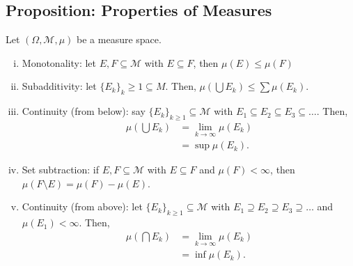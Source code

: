\documentclass[9pt]{extarticle}
\begin{document}
  \subsection{Proposition: Properties of Measures}%
  Let $(\Omega,\mathcal{M},\mu)$ be a measure space.
  \begin{enumerate}[(i)]
    \item Monotonality: let $E,F\subseteq \mathcal{M}$ with $E\subseteq F$, then $\mu(E) \leq \mu(F)$
    \item Subadditivity: let $\{E_k\}_k\geq 1\subseteq M$. Then, $\mu\left(\bigcup E_k\right)\leq \sum \mu(E_k)$.
    \item Continuity (from below): say $\{E_k\}_{k\geq 1}\subseteq \mathcal{M}$ with $E_1\subseteq E_2\subseteq E_3\subseteq \dots$. Then, 
      \begin{align*}
        \mu\left(\bigcup E_k\right) &= \lim_{k\rightarrow\infty}\mu(E_k)\\
        &= \sup \mu(E_k).
      \end{align*}
    \item Set subtraction: if $E,F\subseteq \mathcal{M}$ with $E \subseteq F$ and $\mu(F) < \infty$, then $\mu(F\setminus E) = \mu(F) - \mu(E)$.
    \item Continuity (from above): let $\{E_k\}_{k\geq 1} \subseteq \mathcal{M}$ with $E_1\supseteq E_2\supseteq E_3\supseteq \dots$ and $\mu(E_1) < \infty$. Then,
      \begin{align*}
        \mu\left(\bigcap E_k\right) &= \lim_{k\rightarrow\infty}\mu(E_k)\\
                                    &= \inf \mu(E_k).
      \end{align*}
  \end{enumerate}
\end{document}
